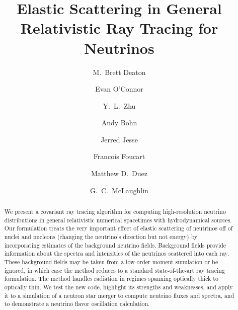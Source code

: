 \documentclass[aps,floatfix,prd,superscriptaddress,twocolumn]{revtex4-1}
\begin{document}
\widetext
{}

\title{Elastic Scattering in General Relativistic Ray Tracing for Neutrinos}

\author{M.\ Brett Deaton}

\author{Evan O'Connor}

\author{Y.\ L.\ Zhu}

\author{Andy Bohn}

\author{Jerred Jesse}

\author{Francois Foucart}

\author{Matthew D.\ Duez}

\author{G.\ C.\ McLaughlin}


\begin{abstract}
  We present a covariant ray tracing algorithm for computing high-resolution
  neutrino distributions in general relativistic numerical spacetimes with
  hydrodynamical sources.
  Our formulation treats the very important effect of
  elastic scattering of neutrinos off of nuclei and nucleons
  (changing the neutrino's direction but not energy)
  by incorporating estimates of the background neutrino fields.
  Background fields provide information about the spectra and intensities of
  the neutrinos scattered into each ray.
  These background fields may be taken from a low-order moment simulation
  or be ignored, in which case the method
  reduces to a standard state-of-the-art ray tracing formulation.
  The method handles radiation in regimes spanning optically thick to optically thin.
  We test the new code, highlight its strengths and weaknesses,
  and apply it to a simulation of a neutron star merger
  to compute neutrino fluxes and spectra,
  and to demonstrate a neutrino flavor oscillation calculation.
\end{abstract}
\end{document}
